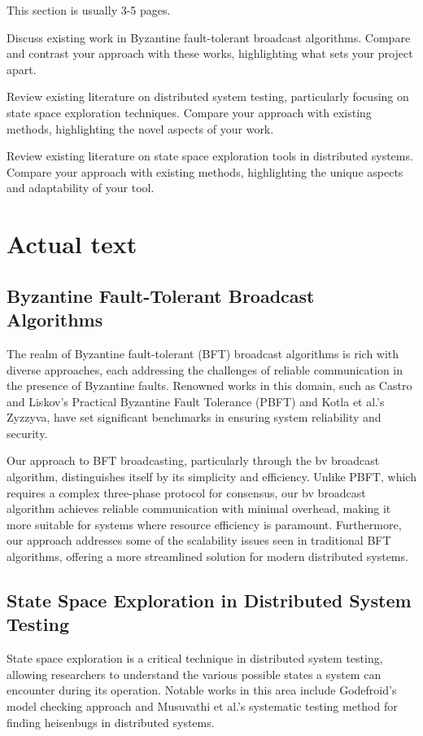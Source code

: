\documentclass[a4paper,11pt,oneside]{report}
\begin{document}
This section is usually 3-5 pages.

Discuss existing work in Byzantine fault-tolerant broadcast algorithms. Compare and contrast your approach with these works, highlighting what sets your project apart.

Review existing literature on distributed system testing, particularly focusing on state space exploration techniques. Compare your approach with existing methods, highlighting the novel aspects of your work.

Review existing literature on state space exploration tools in distributed systems. Compare your approach with existing methods, highlighting the unique aspects and adaptability of your tool.

\section{Actual text}

\subsection{Byzantine Fault-Tolerant Broadcast Algorithms}
The realm of Byzantine fault-tolerant (BFT) broadcast algorithms is rich with diverse approaches, each addressing the challenges of reliable communication in the presence of Byzantine faults. Renowned works in this domain, such as Castro and Liskov's Practical Byzantine Fault Tolerance (PBFT) and Kotla et al.'s Zyzzyva, have set significant benchmarks in ensuring system reliability and security. 

Our approach to BFT broadcasting, particularly through the bv broadcast algorithm, distinguishes itself by its simplicity and efficiency. Unlike PBFT, which requires a complex three-phase protocol for consensus, our bv broadcast algorithm achieves reliable communication with minimal overhead, making it more suitable for systems where resource efficiency is paramount. Furthermore, our approach addresses some of the scalability issues seen in traditional BFT algorithms, offering a more streamlined solution for modern distributed systems.

\subsection{State Space Exploration in Distributed System Testing}
State space exploration is a critical technique in distributed system testing, allowing researchers to understand the various possible states a system can encounter during its operation. Notable works in this area include Godefroid's model checking approach and Musuvathi et al.'s systematic testing method for finding heisenbugs in distributed systems.
\end{document}
